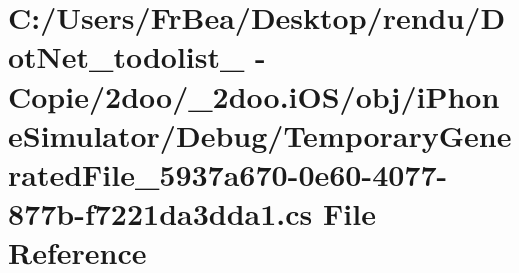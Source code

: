 \hypertarget{i_o_s_2obj_2i_phone_simulator_2_debug_2_temporary_generated_file__5937a670-0e60-4077-877b-f7221da3dda1_8cs}{
\section{C:/Users/FrBea/Desktop/rendu/DotNet\_\-todolist\_ - Copie/2doo/\_\-2doo.iOS/obj/iPhoneSimulator/Debug/TemporaryGeneratedFile\_\-5937a670-0e60-4077-877b-f7221da3dda1.cs File Reference}
\label{i_o_s_2obj_2i_phone_simulator_2_debug_2_temporary_generated_file__5937a670-0e60-4077-877b-f7221da3dda1_8cs}
}

